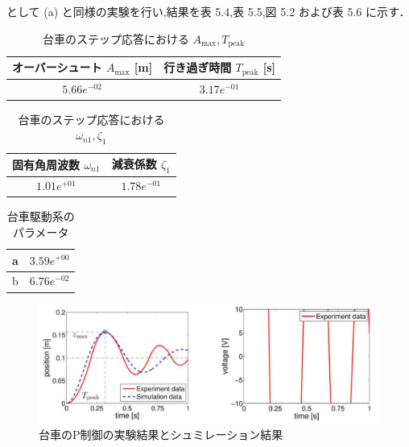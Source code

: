として (a) と同様の実験を行い,結果を表 5.4,表 5.5,図 5.2 および表 5.6 に示す．

\begin{table}[h]
  \centering
  \caption{台車のステップ応答における \( A_{\text{max}}, T_{\text{peak}} \)}
  \label{tab:step_response_1}
  \begin{tabular}{|c|c|}
    \hline
    オーバーシュート \( A_{\text{max}} \) [m] & 行き過ぎ時間 \( T_{\text{peak}} \) [s] \\
    \hline
    \( 5.66e^{-02}\)                          & \( 3.17e^{-01}\)                       \\
    \hline
  \end{tabular}
\end{table}

\begin{table}[h]
  \centering
  \caption{台車のステップ応答における \( \omega_{n1}, \zeta_1 \)}
  \label{tab:step_response_2}
  \begin{tabular}{|c|c|}
    \hline
    固有角周波数 \( \omega_{n1} \) & 減衰係数 \( \zeta_1 \) \\
    \hline
    \(1.01e^{+01}\)                & \( 1.78e^{-01}\)       \\
    \hline
  \end{tabular}
\end{table}

\begin{table}[h]
  \centering
  \caption{台車駆動系のパラメータ}
  \label{tab:drive_system_parameters_2}
  \begin{tabular}{|c|c|}
    \hline
    a & \(3.59e^{+00}\)  \\
    \hline
    b & \( 6.76e^{-02}\) \\
    \hline
  \end{tabular}
\end{table}

\begin{figure}[h]
  \centering
  \includegraphics[scale=1]{sozai/52.pdf}
  \caption{台車のP制御の実験結果とシュミレーション結果}
\end{figure}

